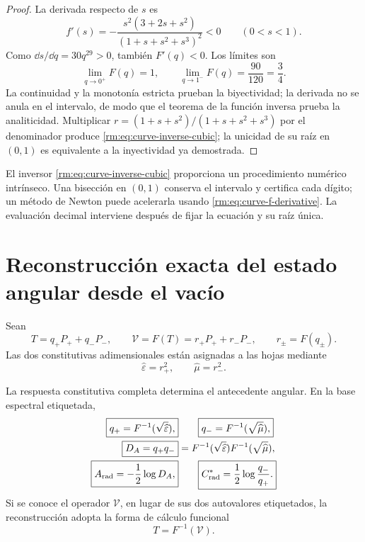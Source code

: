 \begin{proof}
La derivada respecto de \(s\) es
\begin{equation}
 f'(s)
 =-\frac{s^2(3+2s+s^2)}{(1+s+s^2+s^3)^2}<0
 \qquad(0<s<1).
 \label{rm:eq:curve-f-derivative}
\end{equation}
Como \(\dd s/\dd q=30q^{29}>0\), tambi\'en \(F'(q)<0\). Los l\'imites son
\[
 \lim_{q\to0^+}F(q)=1,
 \qquad
 \lim_{q\to1^-}F(q)=\frac{90}{120}=\frac34.
\]
La continuidad y la monoton\'ia estricta prueban la biyectividad; la derivada
no se anula en el intervalo, de modo que el teorema de la funci\'on inversa
prueba la analiticidad. Multiplicar
\(r=(1+s+s^2)/(1+s+s^2+s^3)\) por el denominador produce
\cref{rm:eq:curve-inverse-cubic}; la unicidad de su ra\'iz en \((0,1)\) es
equivalente a la inyectividad ya demostrada.
\end{proof}

El inversor \cref{rm:eq:curve-inverse-cubic} proporciona un procedimiento
num\'erico intr\'inseco. Una bisecci\'on en \((0,1)\) conserva el intervalo y
certifica cada d\'igito; un m\'etodo de Newton puede acelerarla usando
\cref{rm:eq:curve-f-derivative}. La evaluaci\'on decimal interviene despu\'es de
fijar la ecuaci\'on y su ra\'iz \'unica.

\section{Reconstrucci\'on exacta del estado angular desde el vac\'io}

Sean
\begin{equation}
 T=q_+P_++q_-P_-,
 \qquad
 \mathcal V=F(T)=r_+P_++r_-P_-,
 \qquad
 r_\pm=F(q_\pm).
 \label{rm:eq:curve-T-V}
\end{equation}
Las dos constitutivas adimensionales est\'an asignadas a las hojas mediante
\begin{equation}
 \widehat\varepsilon=r_+^2,
 \qquad
 \widehat\mu=r_-^2.
 \label{rm:eq:curve-mu-epsilon}
\end{equation}

\begin{theorem}
\label{rm:thm:curve-vacuum-tomography}
La respuesta constitutiva completa determina el antecedente angular. En la
base espectral etiquetada,
\begin{align}
 \boxed{q_+=F^{-1}(\sqrt{\widehat\varepsilon}),}
 &\qquad
 \boxed{q_-=F^{-1}(\sqrt{\widehat\mu}),}
 \label{rm:eq:curve-recover-qpm}\\
 \boxed{D_A=q_+q_-}
 &=F^{-1}(\sqrt{\widehat\varepsilon})
   F^{-1}(\sqrt{\widehat\mu}),
 \label{rm:eq:curve-recover-DA}\\
 \boxed{A_{\rm rad}=-\frac12\log D_A,}
 &\qquad
 \boxed{C^*_{\rm rad}=\frac12\log\frac{q_-}{q_+}.}
 \label{rm:eq:curve-recover-A-C}
\end{align}
Si se conoce el operador \(\mathcal V\), en lugar de sus dos autovalores
etiquetados, la reconstrucci\'on adopta la forma de c\'alculo funcional
\begin{equation}
 \boxed{T=F^{-1}(\mathcal V).}
 \label{rm:eq:curve-functional-inverse}
\end{equation}
\end{theorem}

